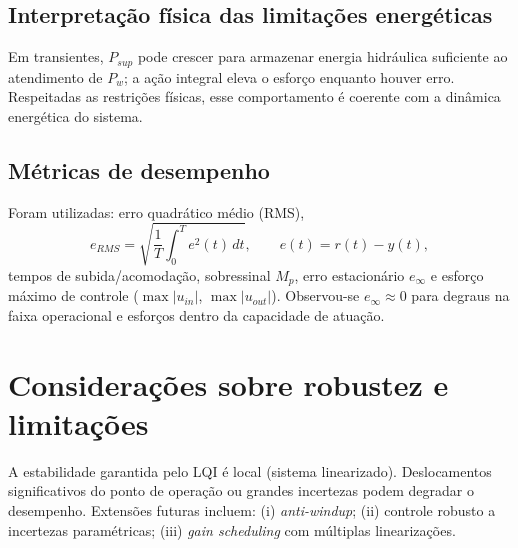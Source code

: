 \subsection{Interpretação física das limitações energéticas}
\label{sec:interpretacao-limitacoes-energeticas}

Em transientes, $P_{sup}$ pode crescer para armazenar energia hidráulica suficiente ao atendimento de $P_w$; a ação integral eleva o esforço enquanto houver erro. Respeitadas as restrições físicas, esse comportamento é coerente com a dinâmica energética do sistema.

\subsection{Métricas de desempenho}
\label{sec:avaliacao-quantitativa-desempenho}

Foram utilizadas: erro quadrático médio (RMS),
\[
e_{RMS}=\sqrt{\frac{1}{T}\int_0^T e^2(t)\,dt},\qquad e(t)=r(t)-y(t),
\]
tempos de subida/acomodação, sobressinal $M_p$, erro estacionário $e_\infty$ e esforço máximo de controle ($\max |u_{in}|$, $\max |u_{out}|$). Observou-se $e_\infty\approx 0$ para degraus na faixa operacional e esforços dentro da capacidade de atuação.

\section{Considerações sobre robustez e limitações}
\label{sec:consideracoes-robustez-limitacoes}

A estabilidade garantida pelo LQI é local (sistema linearizado). Deslocamentos significativos do ponto de operação ou grandes incertezas podem degradar o desempenho. Extensões futuras incluem: (i) \emph{anti-windup}; (ii) controle robusto a incertezas paramétricas; (iii) \emph{gain scheduling} com múltiplas linearizações.


